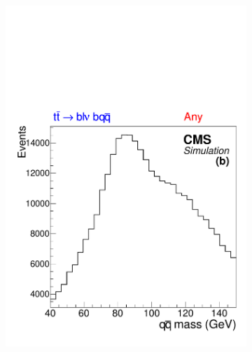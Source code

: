 \begin{figure}[tb]
\begin{subfigure}{0.33\textwidth}
    \includegraphics[width=\textwidth]{figures/dijet-any}
    \caption{}
    \label{sfig:any}
  \end{subfigure}%
  \begin{subfigure}{0.33\textwidth}
    \centering

\end{subfigure}
\end{figure}
